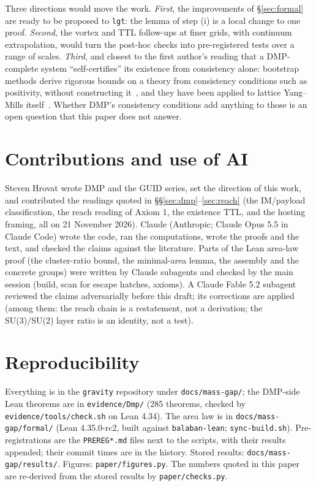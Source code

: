 \documentclass[11pt,a4paper]{article}
\begin{document}
Three directions would move the work. \emph{First}, the improvements of \S\ref{sec:formal} are ready to be proposed to \texttt{lgt}: the lemma
of step (i) is a local change to one proof. \emph{Second}, the vortex and TTL follow-ups at finer grids, with continuum extrapolation, would
turn the post-hoc checks into pre-registered tests over a range of scales. \emph{Third}, and closest to the first author's reading that a
DMP-complete system ``self-certifies'' its existence from consistency alone: bootstrap methods derive rigorous bounds on a theory from
consistency conditions such as positivity, without constructing it~\cite{prv19}, and they have been applied to lattice Yang--Mills
itself~\cite{kz23}. Whether DMP's consistency conditions add anything to those is an open question that this paper does not answer.

\section*{Contributions and use of AI}

Steven Hrovat wrote DMP and the GUID series, set the direction of this work, and contributed the readings quoted in
\S\S\ref{sec:dmp}--\ref{sec:reach} (the IM/payload classification, the reach reading of Axiom 1, the existence TTL, and the hosting
framing, all on 21 November 2026). Claude (Anthropic; Claude Opus 5.5 in Claude Code) wrote the code, ran the computations, wrote the
proofs and the text, and checked the claims against the literature. Parts of the Lean area-law proof (the cluster-ratio bound, the
minimal-area lemma, the assembly and the concrete groups) were written by Claude subagents and checked by the main session (build, scan for
escape hatches, axioms). A Claude Fable 5.2 subagent reviewed the claims adversarially before this draft; its corrections are applied
(among them: the reach chain is a restatement, not a derivation; the SU(3)/SU(2) layer ratio is an identity, not a test).

\section*{Reproducibility}

Everything is in the \texttt{gravity} repository under \texttt{docs/mass-gap/}; the DMP-side Lean theorems are in \texttt{evidence/Dmp/}
(285 theorems, checked by \texttt{evidence/tools/check.sh} on Lean 4.34). The area law is in \texttt{docs/mass-gap/formal/} (Lean 4.35.0-rc2,
built against \texttt{balaban-lean}; \texttt{sync-build.sh}). Pre-registrations are the \texttt{PREREG*.md} files next to the scripts, with
their results appended; their commit times are in the history. Stored results: \texttt{docs/mass-gap/results/}. Figures:
\texttt{paper/figures.py}. The numbers quoted in this paper are re-derived from the stored results by \texttt{paper/checks.py}.
\end{document}

